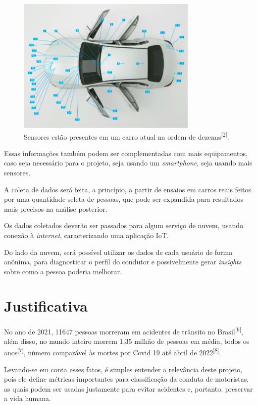 \begin{figure}[hp]
    \centering
    
    \includegraphics[]{figures/sensores_carro.png}
    
    \caption{Sensores estão presentes em um carro atual na ordem de dezenas\textsuperscript{[2]}.}
    
    \label{fig:sensors_car}
\end{figure}

Essas informações também podem ser complementadas com mais equipamentos, caso seja necessário para o projeto, seja usando um \textit{smartphone}, seja usando mais sensores.

A coleta de dados será feita, a princípio, a partir de ensaios em carros reais feitos por uma quantidade seleta de pessoas, que pode ser expandida para resultados mais precisos na análise posterior.

Os dados coletados deverão ser passados para algum serviço de nuvem, usando conexão à \textit{internet}, caracterizando uma aplicação IoT.
	
Do lado da nuvem, será possível utilizar os dados de cada usuário de forma anônima, para diagnosticar o perfil do condutor e possivelmente gerar \textit{insights} sobre como a pessoa poderia melhorar.

 
\section{Justificativa}
No ano de 2021, 11647 pessoas morreram em acidentes de trânsito no Brasil\textsuperscript{[6]}, além disso, no mundo inteiro morrem 1,35 milhão de pessoas em média, todos os anos\textsuperscript{[7]}, número comparável às mortes por Covid 19 até abril de 2022\textsuperscript{[8]}.

Levando-se em conta esses fatos, é simples entender a relevância deste projeto, pois ele define métricas importantes para classificação da conduta de motoristas, as quais podem ser usadas justamente para evitar acidentes e, portanto, preservar a vida humana.

